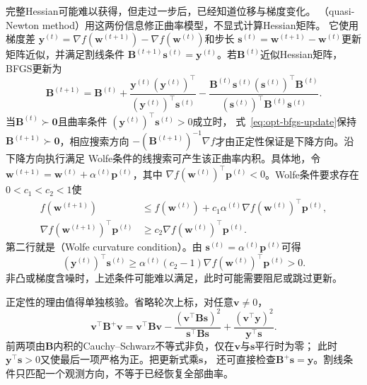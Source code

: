 完整Hessian可能难以获得，但走过一步后，已经知道位移与梯度变化。
（quasi-Newton method）用这两份信息修正曲率模型，不显式计算Hessian矩阵。
它使用梯度差
$\bm{y}^{(t)}=\nabla f(\bm{w}^{(t+1)})-\nabla f(\bm{w}^{(t)})$和步长
$\bm{s}^{(t)}=\bm{w}^{(t+1)}-\bm{w}^{(t)}$更新矩阵近似，并满足割线条件
$\bm{B}^{(t+1)}\bm{s}^{(t)}=\bm{y}^{(t)}$。若$\bm{B}^{(t)}$近似Hessian矩阵，
BFGS更新为
\begin{equation}
  \bm{B}^{(t+1)}
  =
  \bm{B}^{(t)}
  +
  \frac{\bm{y}^{(t)}(\bm{y}^{(t)})^{\top}}
       {(\bm{y}^{(t)})^{\top}\bm{s}^{(t)}}
  -
  \frac{\bm{B}^{(t)}\bm{s}^{(t)}(\bm{s}^{(t)})^{\top}\bm{B}^{(t)}}
       {(\bm{s}^{(t)})^{\top}\bm{B}^{(t)}\bm{s}^{(t)}}.
  \label{eq:opt-bfgs-update}
\end{equation}
当$\bm{B}^{(t)}\succ\bm{0}$且曲率条件
$(\bm{y}^{(t)})^{\top}\bm{s}^{(t)}>0$成立时，
式~\eqref{eq:opt-bfgs-update}保持$\bm{B}^{(t+1)}\succ\bm{0}$，相应搜索方向
$-(\bm{B}^{(t+1)})^{-1}\nabla f$才由正定性保证是下降方向。沿下降方向执行满足
Wolfe条件的线搜索可产生该正曲率内积。具体地，令
$\bm{w}^{(t+1)}=\bm{w}^{(t)}+\alpha^{(t)}\bm{p}^{(t)}$，其中
$\nabla f(\bm{w}^{(t)})^{\top}\bm{p}^{(t)}<0$。Wolfe条件要求存在
$0<c_1<c_2<1$使
\begin{equation}
\begin{aligned}
  f(\bm{w}^{(t+1)})
  &\leq
  f(\bm{w}^{(t)})
  +
  c_1\alpha^{(t)}
  \nabla f(\bm{w}^{(t)})^{\top}\bm{p}^{(t)},\\
  \nabla f(\bm{w}^{(t+1)})^{\top}\bm{p}^{(t)}
  &\geq
  c_2\nabla f(\bm{w}^{(t)})^{\top}\bm{p}^{(t)}.
\end{aligned}
\label{eq:opt-wolfe-conditions}
\end{equation}
第二行就是（Wolfe curvature condition）。由
$\bm{s}^{(t)}=\alpha^{(t)}\bm{p}^{(t)}$可得
\[
  (\bm{y}^{(t)})^{\top}\bm{s}^{(t)}
  \geq
  \alpha^{(t)}(c_2-1)
  \nabla f(\bm{w}^{(t)})^{\top}\bm{p}^{(t)}
  >0.
\]
非凸或梯度含噪时，上述条件可能难以满足，此时可能需要阻尼或跳过更新。

正定性的理由值得单独核验。省略轮次上标，对任意$\bm v\neq0$，
\[
 \bm v^\top\bm B^+\bm v
 =\bm v^\top\bm B\bm v
 -\frac{(\bm v^\top\bm B\bm s)^2}{\bm s^\top\bm B\bm s}
 +\frac{(\bm v^\top\bm y)^2}{\bm y^\top\bm s}.
\]
前两项由$\bm B$内积的Cauchy--Schwarz不等式非负，仅在$\bm v$与$\bm s$平行时为零；
此时$\bm y^\top\bm s>0$又使最后一项严格为正。把更新式乘$\bm s$，
还可直接检查$\bm B^+\bm s=\bm y$。割线条件只匹配一个观测方向，不等于已经恢复全部曲率。

